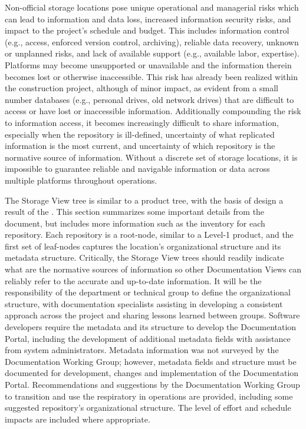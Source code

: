 Non-official storage locations pose unique operational and managerial risks which can lead to information and data loss, increased information security risks, and impact to the project's schedule and budget.
This includes information control (e.g., access, enforced version control, archiving), reliable data recovery, unknown or unplanned risks, and lack of available support (e.g., available labor, expertise).
Platforms may become unsupported or unavailable and the information therein becomes lost or otherwise inaccessible.
This risk has already been realized within the construction project, although of minor impact, as evident from a small number databases (e.g., personal drives, old network drives) that are difficult to access or have lost or inaccessible information. 
Additionally compounding the risk to information access, it becomes increasingly difficult to share information, especially when the repository is ill-defined, uncertainty of what replicated information is the most current, and uncertainty of which repository is the normative source of information.
Without a discrete set of storage locations, it is impossible to guarantee reliable and navigable information or data across multiple platforms throughout operations.

The Storage View tree is similar to a product tree, with the basis of design a result of the .
This section summarizes some important details from the document, but  includes more information such as the inventory for each repository.
Each repository is a root-node, similar to a Level-1 product, and the first set of leaf-nodes captures the location's organizational structure and its metadata structure.
Critically, the Storage View trees should readily indicate what are the normative sources of information so other Documentation Views can reliably refer to the accurate and up-to-date information.
It will be the responsibility of the department or technical group to define the organizational structure, with documentation specialists assisting in developing a consistent approach across the project and sharing lessons learned between groups.
Software developers require the metadata and its structure to develop the Documentation Portal, including the development of additional metadata fields with assistance from system administrators.
Metadata information was not surveyed by the Documentation Working Group; however, metadata fields and structure must be documented for development, changes and implementation of the Documentation Portal.
Recommendations and suggestions by the Documentation Working Group to transition and use the respiratory in operations are provided, including some suggested repository's organizational structure.
The level of effort and schedule impacts are included where appropriate.

